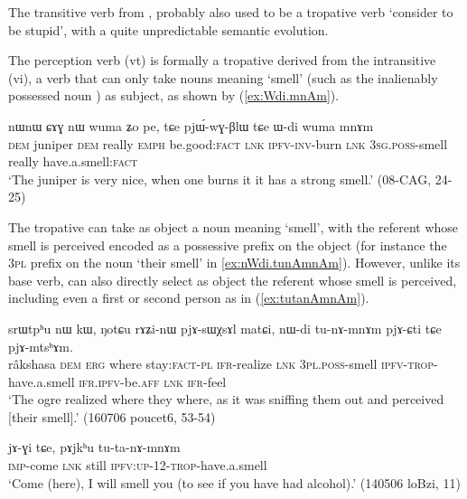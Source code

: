  The transitive verb  from , probably also used to be a tropative verb `consider to be stupid', with a quite unpredictable semantic evolution.

The perception verb  (vt) is formally a tropative derived from the intransitive  (vi), a verb that can only take nouns meaning `smell' (such as the inalienably possessed noun ) as subject, as shown by (\ref{ex:Wdi.mnAm}).

\begin{exe}
\ex \label{ex:Wdi.mnAm}
\gll nɯnɯ ɕɤɣ nɯ wuma ʑo pe, tɕe pjɯ́-wɣ-βlɯ tɕe ɯ-di wuma mnɤm \\
\textsc{dem} juniper \textsc{dem} really \textsc{emph} be.good:\textsc{fact} \textsc{lnk} \textsc{ipfv}-\textsc{inv}-burn \textsc{lnk} \textsc{3sg}.\textsc{poss}-smell really have.a.smell:\textsc{fact} \\
\glt `The juniper is very nice, when one burns it it has a strong smell.' (08-CAG, 24-25)
\end{exe}

The tropative  can take as object a noun meaning `smell', with the referent whose smell is perceived encoded as a possessive prefix on the object (for instance the \textsc{3pl} prefix on the noun  `their smell' in \ref{ex:nWdi.tunAmnAm}). However, unlike its base verb,  can also directly select as object the referent whose smell is perceived, including even a first or second person as in (\ref{ex:tutanAmnAm}).

\begin{exe}
\ex \label{ex:nWdi.tunAmnAm}
\gll srɯtpʰu nɯ kɯ, ŋotɕu rɤʑi-nɯ pjɤ-sɯχsɤl matɕi, nɯ-di tu-nɤ-mnɤm pjɤ-ɕti tɕe pjɤ-mtsʰɤm. \\
râkshasa \textsc{dem} \textsc{erg} where stay:\textsc{fact}-\textsc{pl} \textsc{ifr}-realize \textsc{lnk} \textsc{3pl}.\textsc{poss}-smell \textsc{ipfv}-\textsc{trop}-have.a.smell \textsc{ifr}.\textsc{ipfv}-be.\textsc{aff} \textsc{lnk} \textsc{ifr}-feel \\
\glt `The ogre realized where they where, as it was sniffing them out and perceived [their smell].' (160706 poucet6, 53-54)
\end{exe}


\begin{exe}
\ex \label{ex:tutanAmnAm}
\gll  jɤ-ɣi tɕe, pɤjkʰu tu-ta-nɤ-mnɤm \\
\textsc{imp}-come \textsc{lnk} still \textsc{ipfv}:\textsc{up}-1\fl{}2-\textsc{trop}-have.a.smell \\
\glt `Come (here), I will smell you (to see if you have had alcohol).' (140506 loBzi, 11)
\end{exe}

